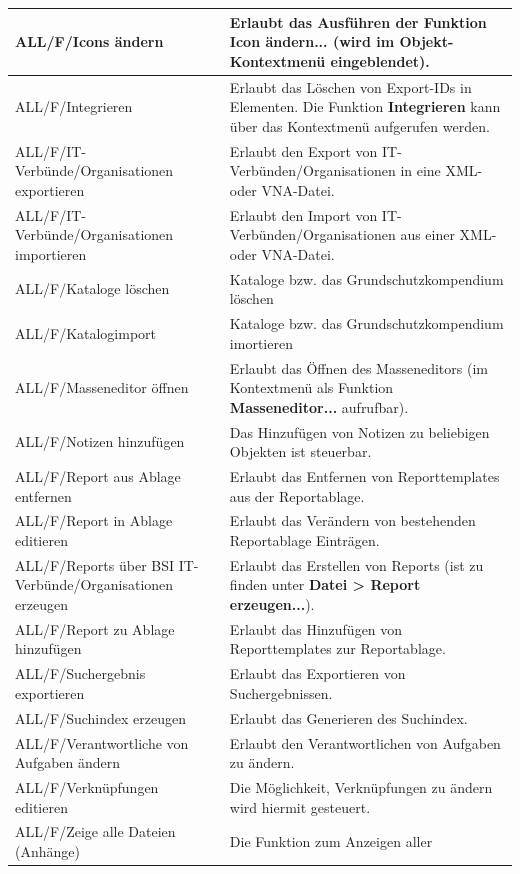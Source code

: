 \documentclass[a4paper,10pt]{book}
\begin{document}
\begin{longtable}{| p{5cm} | p{6cm} |}
ALL/F/Icons ändern & Erlaubt das Ausführen der Funktion \textbf{Icon ändern...}
(wird im Objekt-Kontextmenü eingeblendet). \\[10pt] \hline
ALL/F/Integrieren & Erlaubt das Löschen von Export-IDs in Elementen. Die
Funktion \textbf{Integrieren} kann über das Kontextmenü aufgerufen werden.
\\[10pt] \hline
ALL/F/IT-Verbünde/Organisationen exportieren & Erlaubt den Export von
IT-Verbünden/Organisationen in eine XML- oder VNA-Datei. \\[10pt] \hline
ALL/F/IT-Verbünde/Organisationen importieren & Erlaubt den Import von
IT-Verbünden/Organisationen aus einer XML- oder VNA-Datei. \\[10pt] \hline
ALL/F/Kataloge löschen & Kataloge bzw. das Grundschutzkompendium löschen \\[10pt] \hline
ALL/F/Katalogimport & Kataloge bzw. das Grundschutzkompendium imortieren \\[10pt] \hline
ALL/F/Masseneditor öffnen & Erlaubt das Öffnen des Masseneditors (im
Kontextmenü als Funktion \textbf{Masseneditor...} aufrufbar). \\[10pt] \hline
ALL/F/Notizen hinzufügen & Das Hinzufügen von Notizen zu beliebigen Objekten
ist steuerbar. \\[10pt] \hline
ALL/F/Report aus Ablage entfernen & Erlaubt das Entfernen von Reporttemplates
aus der Reportablage. \\[10pt] \hline
ALL/F/Report in Ablage editieren & Erlaubt das Verändern von bestehenden
Reportablage Einträgen. \\[10pt] \hline
ALL/F/Reports über BSI IT-Verbünde/Organisationen erzeugen & Erlaubt das
Erstellen von Reports (ist zu finden unter \textbf{Datei > Report
erzeugen...}). \\[10pt] \hline
ALL/F/Report zu Ablage hinzufügen & Erlaubt das Hinzufügen von Reporttemplates
zur Reportablage. \\[10pt] \hline
ALL/F/Suchergebnis exportieren & Erlaubt das Exportieren von Suchergebnissen.
\\[10pt] \hline
ALL/F/Suchindex erzeugen & Erlaubt das Generieren des Suchindex. \\[10pt] \hline
ALL/F/Verantwortliche von Aufgaben ändern & Erlaubt den Verantwortlichen von
Aufgaben zu ändern. \\[10pt] \hline
ALL/F/Verknüpfungen editieren & Die Möglichkeit, Verknüpfungen zu ändern wird
hiermit gesteuert. \\[10pt] \hline
ALL/F/Zeige alle Dateien (Anhänge) & Die Funktion zum Anzeigen aller

\end{longtable}
\end{document}
